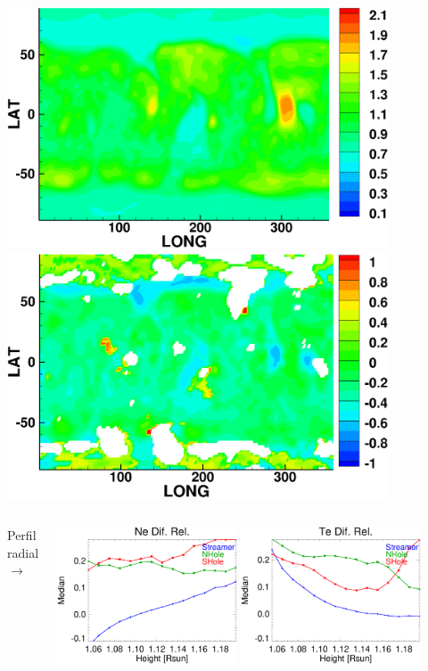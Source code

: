 \documentclass{beamer}
\begin{document}
{\begin{columns}
\begin{center}
\includegraphics[width=0.85\textwidth,height=2.cm]{new_figs/te_awsom_2208_1055.png}
\includegraphics[width=0.85\textwidth,height=2.cm]{new_figs/te_diff_2208_1055.png}
\end{center}
\end{columns}
\vspace{-0.25cm}
\begin{columns}
Perfil radial $\rightarrow$
\begin{center} 
\includegraphics[width=0.45\textwidth,height=0.26\textheight]{new_figs/Median_Ne_2208_v2.eps}
\includegraphics[width=0.45\textwidth,height=0.26\textheight]{new_figs/Median_Te_2082_v2.eps}\\
\end{center}
\end{columns}
}
\end{document}
